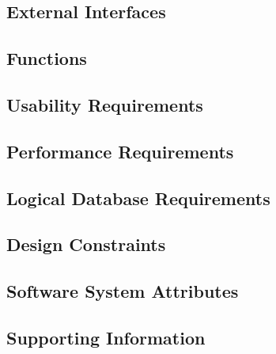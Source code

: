 \subsection{External Interfaces}


\subsection{Functions}


\subsection{Usability Requirements}


\subsection{Performance Requirements}


\subsection{Logical Database Requirements}


\subsection{Design Constraints}


\subsection{Software System Attributes}


\subsection{Supporting Information}
